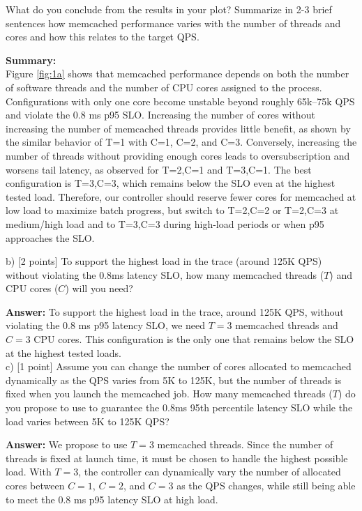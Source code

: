 \begin{enumerate}
    What do you conclude from the results in your plot? Summarize in 2-3 brief sentences how memcached performance varies with the number of threads and cores and how this relates to the target QPS.
    
    \textbf{Summary:} %
    \\
    Figure \ref{fig:1a} shows that memcached performance depends on both the number of software threads and the number of CPU cores assigned to the process. Configurations with only one core become unstable beyond roughly 65k–75k QPS and violate the 0.8 ms p95 SLO. Increasing the number of cores without increasing the number of memcached threads provides little benefit, as shown by the similar behavior of T=1 with C=1, C=2, and C=3. Conversely, increasing the number of threads without providing enough cores leads to oversubscription and worsens tail latency, as observed for T=2,C=1 and T=3,C=1. The best configuration is T=3,C=3, which remains below the SLO even at the highest tested load. Therefore, our controller should reserve fewer cores for memcached at low load to maximize batch progress, but switch to T=2,C=2 or T=2,C=3 at medium/high load and to T=3,C=3 during high-load periods or when p95 approaches the SLO.
    
    b) [2 points] To support the highest load in the trace (around 125K QPS) without violating the 0.8ms latency SLO, how many memcached threads ($T$) and CPU cores ($C$) will you need?
    
    \textbf{Answer:} To support the highest load in the trace, around 125K QPS, without violating the 0.8 ms p95 latency SLO, we need $T=3$ memcached threads and $C=3$ CPU cores. This configuration is the only one that remains below the SLO at the highest tested loads.
    \\
    
    c) [1 point] Assume you can change the number of cores allocated to memcached dynamically as the QPS varies from 5K to 125K, but the number of threads is fixed when you launch the memcached job. How many memcached threads ($T$) do you propose to use to guarantee the 0.8ms 95th percentile latency SLO while the load varies between 5K to 125K QPS?
    
    \textbf{Answer:} We propose to use $T=3$ memcached threads. Since the number of threads is fixed at launch time, it must be chosen to handle the highest possible load. With $T=3$, the controller can dynamically vary the number of allocated cores between $C=1$, $C=2$, and $C=3$ as the QPS changes, while still being able to meet the 0.8 ms p95 latency SLO at high load.
    \\
    

\end{enumerate}
